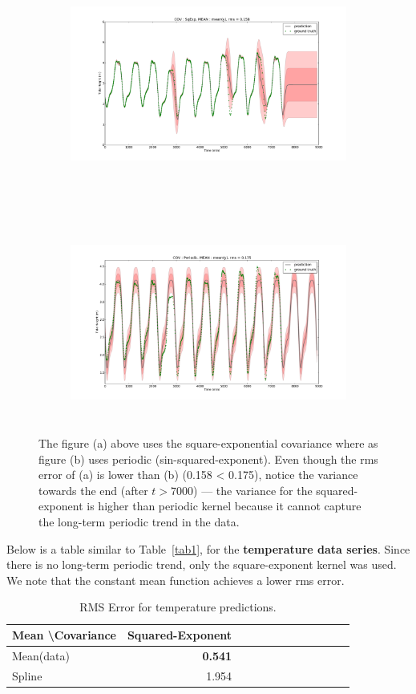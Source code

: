 \documentclass[11pt]{report}
\begin{document}
\begin{figure}[h]
\begin{subfigure}[h]{\linewidth}
\includegraphics[width=15cm, height=6.5cm]{figs/h_sqexp_const.pdf}
\caption{}
\end{subfigure}\\
\begin{subfigure}[h]{\linewidth}
\includegraphics[width=15cm, height=6.5cm]{figs/h_per_const.pdf}
\caption{}
\end{subfigure}%
\caption[]{The figure (a) above uses the square-exponential covariance where as figure (b) uses periodic (sin-squared-exponent). Even though the rms error of (a) is lower than (b) (0.158 < 0.175), notice the variance towards the end (after $t>7000$) --- the variance for the squared-exponent is higher than periodic kernel because it cannot capture the long-term periodic trend in the data.}
\label{fig:f1}
\end{figure}
\clearpage

Below is a table similar to Table~\ref{tab1}, for the \textbf{temperature data series}. Since there is no long-term periodic trend, only the square-exponent kernel was used. We note that the constant mean function achieves a lower rms error.
\begin{table}[h]
\begin{center}
\begin{tabular}{|l||r|r|r|r|r|r|r|r|r|r|r|}
\hline
Mean \textbackslash Covariance & Squared-Exponent \\\hline\hline
Mean(data) & \textbf{0.541} \\\hline
Spline     & 1.954\\\hline
\end{tabular}
\caption{RMS Error for temperature predictions.}
\label{tab2}
\end{center}
\end{table}
\end{document}
